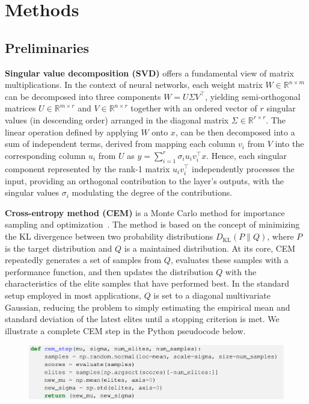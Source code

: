 \section{Methods}
\label{sec:methods}

\subsection{Preliminaries}

\textbf{Singular value decomposition (SVD)} offers a fundamental view of matrix multiplications.
In the context of neural networks, each weight matrix $W \in \mathbb{R}^{n \times m}$ can be decomposed into three components $W = U \Sigma V^\intercal$, yielding semi-orthogonal matrices $U \in \mathbb{R}^{m \times r}$ and $V \in \mathbb{R}^{n \times r}$ together with an ordered vector of $r$ singular values (in descending order) arranged in the diagonal matrix $\Sigma \in \mathbb{R}^{r \times r}$.
The linear operation defined by applying $W$ onto $x$, can be then decomposed into a sum of independent terms, derived from mapping each column $v_i$ from $V$ into the corresponding column $u_i$ from $U$ as $y=\sum_{i=1}^r \sigma_i u_i v_i^\intercal x$.
Hence, each singular component represented by the rank-1 matrix $u_i v_i^\intercal$ independently processes the input, providing an orthogonal contribution to the layer's outputs, with the singular values $\sigma_i$ modulating the degree of the contributions.

\textbf{Cross-entropy method (CEM)} is a Monte Carlo method for importance sampling and optimization~\citep{rubinstein2004cross}.
The method is based on the concept of minimizing the KL divergence between two probability distributions $D_\mathrm{KL}(P\|Q)$, where $P$ is the target distribution and $Q$ is a maintained distribution. 
At its core, CEM repeatedly generates a set of samples from $Q$, evaluates these samples with a performance function, and then updates the distribution $Q$ with the characteristics of the elite samples that have performed best. In the standard setup employed in most applications, $Q$ is set to a diagonal multivariate Gaussian, reducing the problem to simply estimating the empirical mean and standard deviation of the latest elites until a stopping criterion is met.
We illustrate a complete CEM step in the Python pseudocode below.

\begin{figure}[!h]
    \centering
    \includegraphics[width=\textwidth]{images/cem_code.png}
    \label{fig:cem_code}
\vspace{-5mm}
\end{figure}

